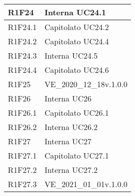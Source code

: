 \begin{center}
\begin{longtable}{|p{22mm}|p{44mm}|}
R1F24 &
Interna \newline
UC24.1 \newline
\\
\hline

R1F24.1 &
Capitolato \newline
UC24.2 \newline
\\
\hline

R1F24.2 &
Capitolato \newline
UC24.4 \newline
\\
\hline

R1F24.3 &
Interna \newline
UC24.5 \newline
\\
\hline

R1F24.4 &
Capitolato \newline
UC24.6 \newline
\\
\hline

R1F25 &
VE\_2020\_12\_18v.1.0.0 \newline
\\
\hline

R1F26 &
Interna \newline
UC26 \newline
\\
\hline

R1F26.1 &
Capitolato \newline
UC26.1 \newline
\\
\hline

R1F26.2 &
Interna \newline
UC26.2 \newline
\\
\hline

R1F27 &
Interna \newline
UC27 \newline
\\
\hline

R1F27.1 &
Capitolato \newline
UC27.1 \newline
\\
\hline

R1F27.2 &
Interna \newline
UC27.2 \newline
\\
\hline

R1F27.3 &
VE\_2021\_01\_01v.1.0.0 \newline
\\
\hline


\end{longtable}
\end{center}
